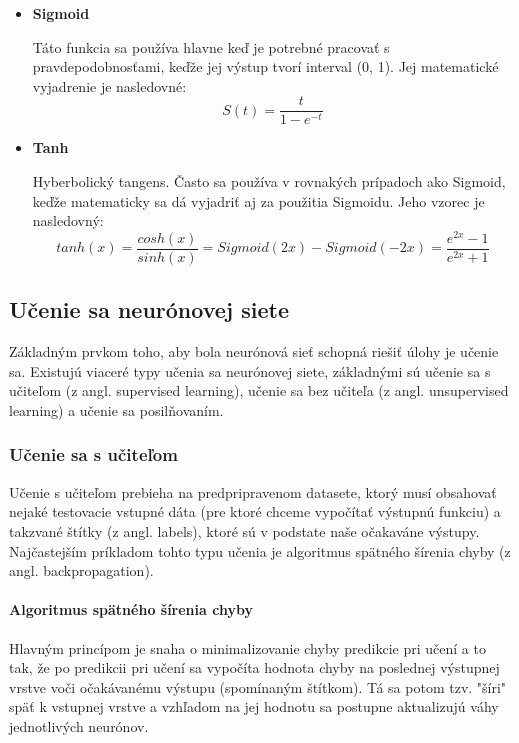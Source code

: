 \begin{itemize}
		\item{\textbf{Sigmoid}}
		
		Táto funkcia sa používa hlavne keď je potrebné pracovať s pravdepodobnosťami, keďže jej výstup tvorí interval (0, 1). Jej matematické vyjadrenie je nasledovné:
		\begin{equation}
		S(t) = \frac{t}{1-e^{-t}}
		\end{equation}
		
		\item {\textbf{Tanh}}
		
		Hyberbolický tangens. Často sa používa v rovnakých prípadoch ako Sigmoid, keďže matematicky sa dá vyjadriť aj za použitia Sigmoidu. Jeho vzorec je nasledovný:
		\begin{equation}
			tanh(x)=\frac{cosh(x)}{sinh(x)}=Sigmoid(2x)-Sigmoid(-2x)=\frac{e^{2x}-1}{e^{2x}+1}
		\end{equation}
	\end{itemize}
	
\subsection{Učenie sa neurónovej siete}
	
Základným prvkom toho, aby bola neurónová sieť schopná riešiť úlohy je učenie sa. Existujú viaceré typy učenia sa neurónovej siete, základnými sú učenie sa s učiteľom (z angl. supervised learning), učenie sa bez učiteľa (z angl. unsupervised learning\cite{unsupervised}) a učenie sa posilňovaním\cite{mnih2013playing}. 

\subsubsection{Učenie sa s učiteľom}
Učenie s učiteľom prebieha na predpripravenom datasete, ktorý musí obsahovať nejaké testovacie vstupné dáta (pre ktoré chceme vypočítať výstupnú funkciu) a takzvané štítky (z angl. labels), ktoré sú v podstate naše očakaváne výstupy. Najčastejším príkladom tohto typu učenia je algoritmus spätného šírenia chyby (z angl. backpropagation\cite{nielsen2015neural}).

\paragraph{Algoritmus spätného šírenia chyby}
Hlavným princípom je snaha o minimalizovanie chyby predikcie pri učení a to tak, že po predikcii pri učení sa vypočíta hodnota chyby na poslednej výstupnej vrstve voči očakávanému výstupu (spomínaným štítkom). Tá sa potom tzv. "šíri" späť k vstupnej vrstve a vzhľadom na jej hodnotu sa postupne aktualizujú váhy jednotlivých neurónov.


